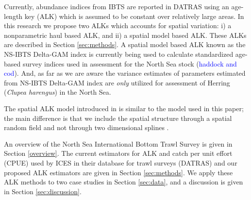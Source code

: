 \documentclass[a4paper 12pt]{article}
\numberwithin{equation}{section}
\newcommand{\nat}[1]{\textcolor{blue}{#1}}
\begin{document}
Currently, abundance indices from IBTS are reported in DATRAS \citep{datras} using an age-length key (ALK) \citep{fridriksson1934calculation} which is assumed to be constant over relatively large areas. In this research we propose two ALKs which accounts for spatial variation: i) a nonparametric  haul based ALK, and ii) a spatial model based ALK. These ALKs are described in Section \ref{sec:methods}. %
A spatial model based ALK \citep{berg2012spatial, berg2014evaluation} known as the NS-IBTS Delta-GAM index \citep{ICES2016b} is currently being used to calculate standardized age-based survey indices used in assessment for the North Sea stock (\nat{haddock and cod}). And, as far as we are aware the variance estimates of parameters estimated from NS-IBTS Delta-GAM index  are \textit{only} utilized for assessment of Herring (\textit{Clupea harengus}) in the North Sea.

The spatial ALK model introduced in \citet{berg2012spatial} is similar to the model used in this paper; the main difference is that we include the spatial structure through a spatial random field \citep{lindgren2011explicit} and not through two dimensional splines \citep{wood2017generalized}.

 An  overview of the  North Sea International Bottom Trawl Survey is given in Section \ref{overview}. The current estimators for ALK and catch per unit effort (CPUE) used by ICES in their database for trawl surveys (DATRAS) and our proposed ALK estimators are given in Section \ref{sec:methods}. We apply these ALK methods to two case studies in Section  \ref{sec:data}, and a discussion is given in Section \ref{sec:discussion}.
\end{document}
